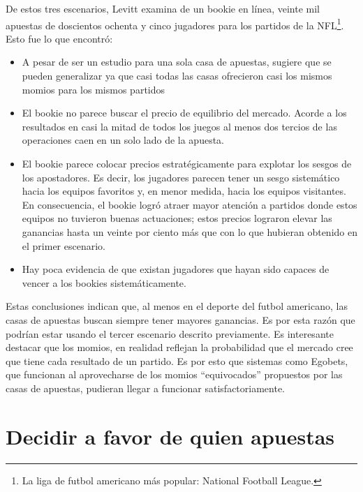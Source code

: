  De estos tres escenarios, Levitt \cite{levitt2004gambling} examina de un bookie en línea, veinte mil apuestas de doscientos ochenta y cinco jugadores para los partidos de la NFL\footnote{La liga de futbol americano más popular: National Football League.}. Esto fue lo que encontró:
 \begin{itemize}
  \item A pesar de ser un estudio para una sola casa de apuestas, sugiere que se pueden generalizar ya que casi todas las casas ofrecieron casi los mismos momios para los mismos partidos
  \item El bookie no parece buscar el precio de equilibrio del mercado. Acorde a los resultados en casi la mitad de todos los juegos al menos dos tercios de las operaciones caen en un solo lado de la apuesta.
  \item El bookie parece colocar precios estratégicamente para explotar los sesgos de los apostadores. Es decir, los jugadores parecen tener un sesgo sistemático hacia los equipos favoritos y, en menor medida, hacia los equipos visitantes. En consecuencia, el bookie logró atraer mayor atención a partidos donde estos equipos no tuvieron buenas actuaciones; estos precios lograron elevar las ganancias hasta un veinte por ciento más que con lo que hubieran obtenido en el primer escenario.
  \item Hay poca evidencia de que existan jugadores que hayan sido capaces de vencer a los bookies sistemáticamente.
  \end{itemize}
 
 Estas conclusiones indican que, al menos en el deporte del futbol americano, las casas de apuestas buscan siempre tener mayores ganancias. Es por esta razón que podrían estar usando el tercer escenario descrito previamente. Es interesante destacar que los momios, en realidad reflejan la probabilidad que el mercado cree que tiene cada resultado de un partido. Es por esto que sistemas como Egobets, que funcionan al aprovecharse de los momios ``equivocados'' propuestos por las casas de apuestas, pudieran llegar a funcionar satisfactoriamente.
 
 
 \section{Decidir a favor de quien apuestas}

